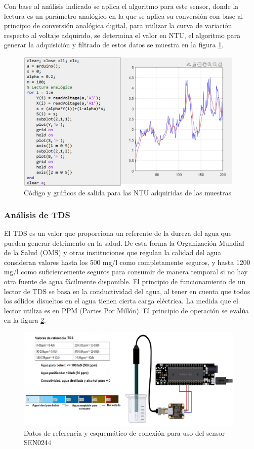 \documentclass[conference]{IEEEtran}
\begin{document}
	
Con base al análisis indicado se aplica el algoritmo para este sensor, donde la lectura es un parámetro analógico en la que se aplica su conversión con base al principio de conversión analógica digital, para utilizar la curva de variación respecto al voltaje adquirido, se determina el valor en NTU, el algoritmo para generar la adquisición y filtrado de estos datos se muestra en la figura \ref{fig:13}.

\begin{figure}[htbp]
	\centering
	\includegraphics[width=0.8\columnwidth]{fig13.jpg}
	\caption{Código y gráficos de salida para las NTU adquiridas de las muestras}
	\label{fig:13}
\end{figure}

\subsubsection{Análisis de TDS}

El TDS es un valor que proporciona un referente de la dureza del agua que pueden generar detrimento en la salud. De esta forma la Organización Mundial de la Salud (OMS) y otras instituciones que regulan la calidad del agua consideran valores hasta los 500 mg/l como completamente seguros, y hasta 1200 mg/l como suficientemente seguros para consumir de manera temporal si no hay otra fuente de agua fácilmente disponible\cite{b29}. El principio de funcionamiento de un lector de TDS se basa en la conductividad del agua, al tener en cuenta que todos los sólidos disueltos en el agua tienen cierta carga eléctrica. La medida que el lector utiliza es en PPM (Partes Por Millón). El principio de operación se evalúa en la figura \ref{fig:14}.

\begin{figure}[htbp]
	\centering
	\includegraphics[width=0.8\columnwidth]{fig14.jpg}
	\caption{Datos de referencia y esquemático de conexión para uso del sensor SEN0244}
	\label{fig:14}
\end{figure}
\end{document}
